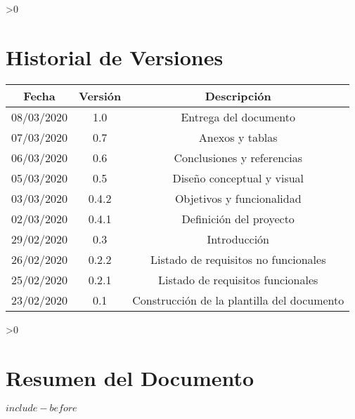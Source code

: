 \documentclass[12pt]{book} %
\newcounter{versiones}
\newcounter{resumen}
\newcounter{tablas}
\begin{document}
\setlength{\cftbeforelottitleskip}{0.5cm}
\renewcommand{\cftlottitlefont}{\Huge\color{green_uam}}

\setlength{\cftbeforeloftitleskip}{0.5cm}
\renewcommand{\cftloftitlefont}{\Huge\color{green_uam}}

\makeatletter
\patchcmd{\chapter}{\if@openright\cleardoublepage\else\clearpage\fi}{\newpage}{}{}
\makeatother

\ifnum \value{versiones}>0
{
    
    
    \chapter*{Historial de Versiones}
    
    \begin{center}
        \begin{tabular}{c|c|c}
            \bfseries Fecha & \bfseries Versión & \bfseries Descripción \\
            \hline
            08/03/2020 & 1.0 & Entrega del documento\\
            \hline
            07/03/2020 & 0.7 & Anexos y tablas\\
            \hline
            06/03/2020 & 0.6 & Conclusiones y referencias\\
            \hline
            05/03/2020 & 0.5 & Diseño conceptual y visual\\
            \hline
            03/03/2020 & 0.4.2 & Objetivos y funcionalidad\\
            \hline
            02/03/2020 & 0.4.1 & Definición del proyecto\\
            \hline
            29/02/2020 & 0.3 & Introducción\\
            \hline
            26/02/2020 & 0.2.2 & Listado de requisitos no funcionales\\
            \hline
            25/02/2020 & 0.2.1 & Listado de requisitos funcionales\\
            \hline
            23/02/2020 & 0.1 & Construcción de la plantilla del documento\\
            \hline
        \end{tabular}
    \end{center}
    
\newpage
}
\fi

\ifnum \value{resumen}>0
{
\chapter*{Resumen del Documento}

$include-before$

\newpage
}
\fi
\end{document}
